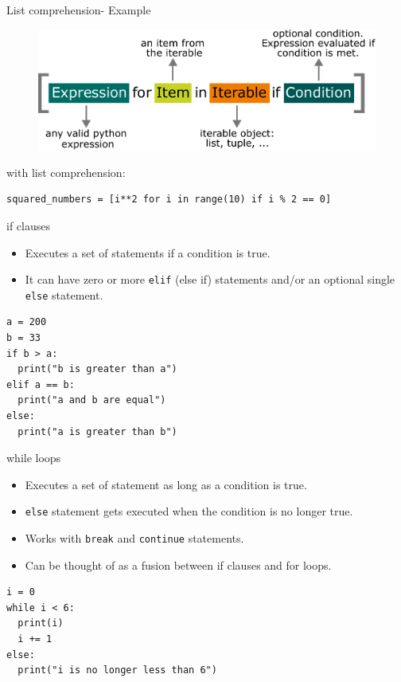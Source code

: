 \documentclass[compress%
,aspectratio=169%
]{beamer}
\newcommand{\code}{\lstinline}
\begin{document}
\begin{frame}[fragile]{List comprehension- Example}
\begin{figure}
    \centering
    \includegraphics[width=0.6\linewidth]{mpimgbeamertheme/img/list_comprehension.pdf}
\end{figure}

with list comprehension:
\begin{lstlisting}
squared_numbers = [i**2 for i in range(10) if i % 2 == 0]
\end{lstlisting}
\end{frame}


\begin{frame}[fragile]{if clauses}
\begin{itemize}
    \item Executes a set of statements if a condition is true.
    \item It can have zero or more \code|elif| (else if) statements and/or an optional single \code|else| statement.
\end{itemize}

\begin{lstlisting}
a = 200
b = 33
if b > a:
  print("b is greater than a")
elif a == b:
  print("a and b are equal")
else:
  print("a is greater than b")
\end{lstlisting}
\end{frame}




\begin{frame}[fragile]{while loops}
\begin{itemize}
    \item Executes a set of statement as long as a condition is true.
    \item \code|else| statement gets executed when the condition is no longer true.
    \item Works with \code|break| and \code|continue| statements.
    \item Can be thought of as a fusion between if clauses and for loops.
\end{itemize}
\begin{lstlisting}
i = 0
while i < 6:
  print(i)
  i += 1
else:
  print("i is no longer less than 6")
\end{lstlisting}
\end{frame}
\end{document}
